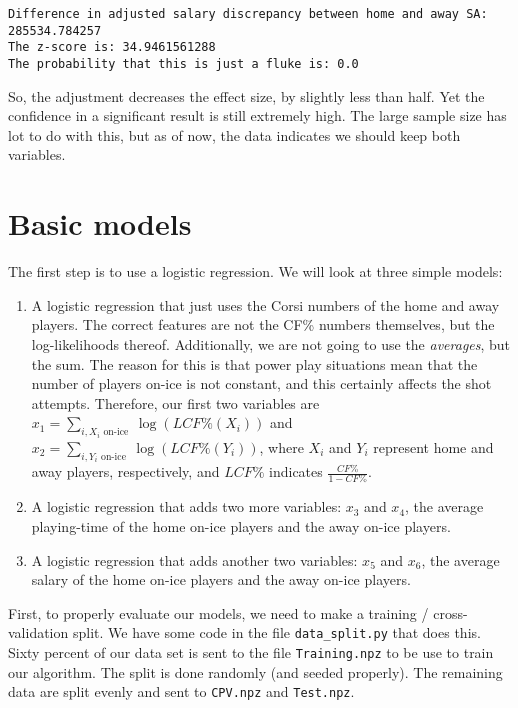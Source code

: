 \documentclass[11pt]{article}
\begin{document}
    \begin{Verbatim}[commandchars=\\\{\}]
Difference in adjusted salary discrepancy between home and away SA: 285534.784257
The z-score is: 34.9461561288
The probability that this is just a fluke is: 0.0

    \end{Verbatim}

    So, the adjustment decreases the effect size, by slightly less than
half. Yet the confidence in a significant result is still extremely
high. The large sample size has lot to do with this, but as of now, the
data indicates we should keep both variables.

    \section{Basic models}\label{basic-models}

    The first step is to use a logistic regression. We will look at three
simple models:

\begin{enumerate}
\def\labelenumi{\arabic{enumi}.}
\item
  A logistic regression that just uses the Corsi numbers of the home and
  away players. The correct features are not the CF\% numbers
  themselves, but the log-likelihoods thereof. Additionally, we are not going
  to use the \emph{averages}, but the sum. The reason for this is that power play
  situations mean that the number of players on-ice is not constant,
  and this certainly affects the shot attempts. Therefore, our first two
  variables are $x_1 = \sum_{i, X_i \textrm{ on-ice }} \log(LCF\%(X_i))$
  and $x_2 = \sum_{i, Y_i \textrm{ on-ice }} \log(LCF\%(Y_i))$, where
  $X_i$ and $Y_i$ represent home and away players, respectively, and $LCF\%$ indicates $\frac{CF\%}{1-CF\%}$.
\item
  A logistic regression that adds two more variables: $x_3$ and $x_4$,
  the average playing-time of the home on-ice players and the away
  on-ice players.
\item
  A logistic regression that adds another two variables: $x_5$ and
  $x_6$, the average salary of the home on-ice players and the away
  on-ice players.
\end{enumerate}

First, to properly evaluate our models, we need to make a training /
cross-validation split. We have some code in the file
\texttt{data\_split.py} that does this. Sixty percent of our data set is
sent to the file \texttt{Training.npz} to be use to train our algorithm.
The split is done randomly (and seeded properly). The remaining data are
split evenly and sent to \texttt{CPV.npz} and \texttt{Test.npz}.
\end{document}
